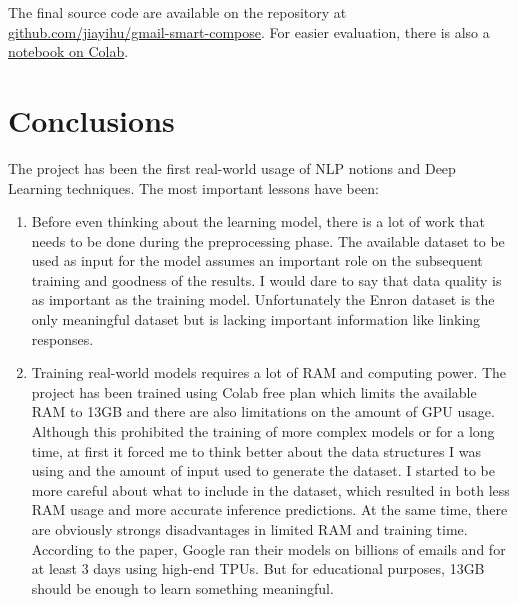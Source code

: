 \documentclass{article}
\begin{document}
The final source code are available on the repository at \href{https://github.com/jiayihu/gmail-smart-compose}{github.com/jiayihu/gmail-smart-compose}. For easier evaluation, there is also a \href{https://colab.research.google.com/drive/1wjr-Ntnd4zYMneyGUz1beEmyw0fwgnEG?usp=sharing}{notebook on Colab}.

\section{Conclusions}\label{conclusions}

The project has been the first real-world usage of NLP notions and Deep Learning techniques. The most important lessons have been:

\begin{enumerate}
\item
  Before even thinking about the learning model, there is a lot of work that needs to be done during the preprocessing phase. The available dataset to be used as input for the model assumes an important role on the subsequent training and goodness of the results. I would dare to say that data quality is as important as the training model. Unfortunately the Enron dataset is the only meaningful dataset but is lacking important information like linking responses.
\item
  Training real-world models requires a lot of RAM and computing power. The project has been trained using Colab free plan which limits the available RAM to 13GB and there are also limitations on the amount of GPU usage. Although this prohibited the training of more complex models or for a long time, at first it forced me to think better about the data structures I was using and the amount of input used to generate the dataset. I started to be more careful about what to include in the dataset, which resulted in both less RAM usage and more accurate inference predictions. At the same time, there are obviously strongs disadvantages in limited RAM and training time. According to the paper, Google ran their models on billions of emails and for at least 3 days using high-end TPUs. But for educational purposes, 13GB should be enough to learn something meaningful.
\end{enumerate}


\end{document}
